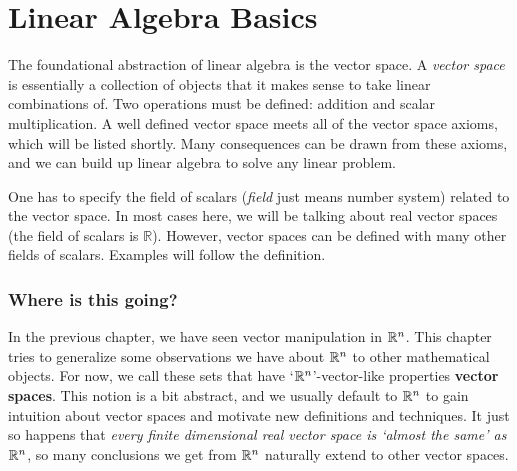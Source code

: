 \chapter{Linear Algebra Basics}

\setcounter{exercisecounter}{0}

\setcounter{thmcounter}{0}
    The foundational abstraction of linear algebra is the vector space. A \textit{vector space} is essentially a collection of objects that it
makes sense to take linear combinations of. Two operations must be defined: addition and scalar multiplication. A well defined
vector space meets all of the vector space axioms, which will be listed shortly. Many consequences can be drawn from these axioms,
and we can build up linear algebra to solve any linear problem.

\begin{remark}
	One has to specify the field of scalars (\textit{field} just means number system) related to the vector space. In most cases
here, we will be talking about real vector spaces (the field of scalars is $\mathbb{R}$). However, vector spaces can be defined with
many other fields of scalars. Examples will follow the definition.
\end{remark}
\subsection*{Where is this going?}
In the previous chapter, we have seen vector manipulation in $\mathbb{R}^n$. This chapter tries to generalize some observations we have about $\mathbb{R}^n$ to other mathematical objects.
For now, we call these sets that have `$\mathbb{R}^n$'-vector-like properties \textbf{vector spaces}. This notion is a bit abstract, and we usually default to $\mathbb{R}^n$
to gain intuition about vector spaces and motivate new definitions and techniques. It just so happens that \textit{every finite dimensional real vector space is `almost the same' as $\mathbb{R}^n$},
so many conclusions we get from $\mathbb{R}^n$ naturally extend to other vector spaces.

